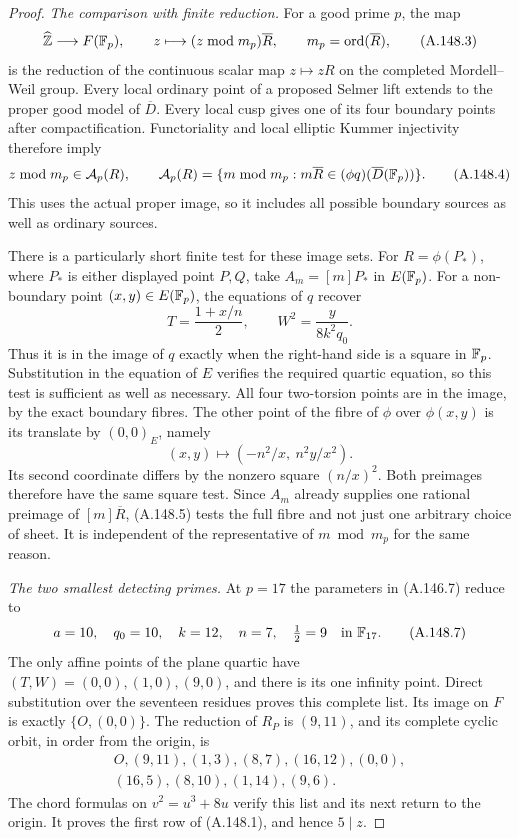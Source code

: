 \begin{proof}
\emph{The comparison with finite reduction.}
For a good prime \(p\), the map
\[
 \widehat{\mathbb Z}\longrightarrow F(\mathbb F_p),\qquad
              z\longmapsto (z\bmod m_p)\overline R,
       \qquad m_p=\operatorname{ord}(\overline R),
\tag{A.148.3}
\]
is the reduction of the continuous scalar map
\(z\mapsto zR\) on the completed Mordell--Weil group.
Every local ordinary point of a proposed Selmer lift extends
to the proper good model of \(\overline D\).
Every local cusp gives one of its four boundary points after
compactification.  Functoriality and local elliptic Kummer
injectivity therefore imply
\[
            z\bmod m_p\in\mathcal A_p(R),\qquad
 \mathcal A_p(R)=
       \{m\bmod m_p:m\overline R\in(\phi q)(\overline D(\mathbb F_p))\}.
\tag{A.148.4}
\]
This uses the actual proper image, so it includes all possible
boundary sources as well as ordinary sources.

There is a particularly short finite test for these image sets.
For \(R=\phi(P_*)\), where \(P_*\) is either displayed
point \(P,Q\), take \(A_m=[m]P_*\) in \(E(\mathbb F_p)\).
For a non-boundary point \((x,y)\in E(\mathbb F_p)\), the equations
of \(q\) recover
\[
                    T=\frac{1+x/n}{2},\qquad
                    W^2=\frac{y}{8k^2q_0}.
\tag{A.148.5}
\]
Thus it is in the image of \(q\) exactly when the right-hand
side is a square in \(\mathbb F_p\).
Substitution in the equation of \(E\) verifies the required
quartic equation, so this test is sufficient as well as necessary.
All four two-torsion points are in the image, by the exact
boundary fibres.
The other point of the fibre of \(\phi\) over
\(\phi(x,y)\) is its translate by \((0,0)_E\), namely
\[
                (x,y)\longmapsto
                       (-n^2/x,\ n^2y/x^2).
\tag{A.148.6}
\]
Its second coordinate differs by the nonzero square \((n/x)^2\).
Both preimages therefore have the same square test.
Since \(A_m\) already supplies one rational preimage of
\([m]\overline R\), (A.148.5) tests the full fibre and
not just one arbitrary choice of sheet.
It is independent of the representative of \(m\bmod m_p\)
for the same reason.

\emph{The two smallest detecting primes.}
At \(p=17\) the parameters in (A.146.7) reduce to
\[
              a=10,\quad q_0=10,\quad k=12,\quad n=7,
                    \quad \tfrac12=9\quad\text{in }\mathbb F_{17}.
\tag{A.148.7}
\]
The only affine points of the plane quartic have
\((T,W)=(0,0),(1,0),(9,0)\), and there is its one
infinity point.  Direct substitution over the seventeen
residues proves this complete list.
Its image on \(F\) is exactly \(\{O,(0,0)\}\).
The reduction of \(R_P\) is \((9,11)\), and its complete
cyclic orbit, in order from the origin, is
\[
 \begin{gathered}
 O,(9,11),(1,3),(8,7),(16,12),(0,0),\\
                    (16,5),(8,10),(1,14),(9,6).
 \end{gathered}
\tag{A.148.8}
\]
The chord formulas on \(v^2=u^3+8u\) verify this list
and its next return to the origin.  It proves the first row
of (A.148.1), and hence \(5\mid z\).


\end{proof}
